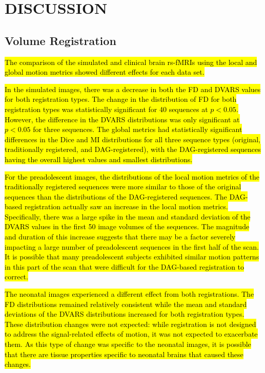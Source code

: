 \chapter{DISCUSSION}
\label{ch:discussion}

\section{Volume Registration}

\hl{The comparison of the simulated and clinical brain rs-fMRIs using the local and global motion metrics showed different effects for each data set. }

\hl{In the simulated images, there was a decrease in both the FD and DVARS values for both registration types. The change in the distribution of FD for both registration types was statistically significant for 40 sequences at $p < 0.05$. However, the difference in the DVARS distributions was only significant at $p < 0.05$ for three sequences. The global metrics had statistically significant differences in the Dice and MI distributions for all three sequence types (original, traditionally registered, and DAG-registered), with the DAG-registered sequences having the overall highest values and smallest distributions.}

\hl{For the preadolescent images, the distributions of the local motion metrics of the traditionally registered sequences were more similar to those of the original sequences than the distributions of the DAG-registered sequences. The DAG-based registration actually saw an increase in the local motion metrics. Specifically, there was a large spike in the mean and standard deviation of the DVARS values in the first 50 image volumes of the sequences. The magnitude and duration of this increase suggests that there may be a factor severely impacting a large number of preadolescent sequences in the first half of the scan. It is possible that many preadolescent subjects exhibited similar motion patterns in this part of the scan that were difficult for the DAG-based registration to correct.}

\hl{The neonatal images experienced a different effect from both registrations. The FD distributions remained relatively consistent while the mean and standard deviations of the DVARS distributions increased for both registration types. These distribution changes were not expected: while registration is not designed to address the signal-related effects of motion, it was not expected to exacerbate them. As this type of change was specific to the neonatal images, it is possible that there are tissue properties specific to neonatal brains that caused these changes.}


